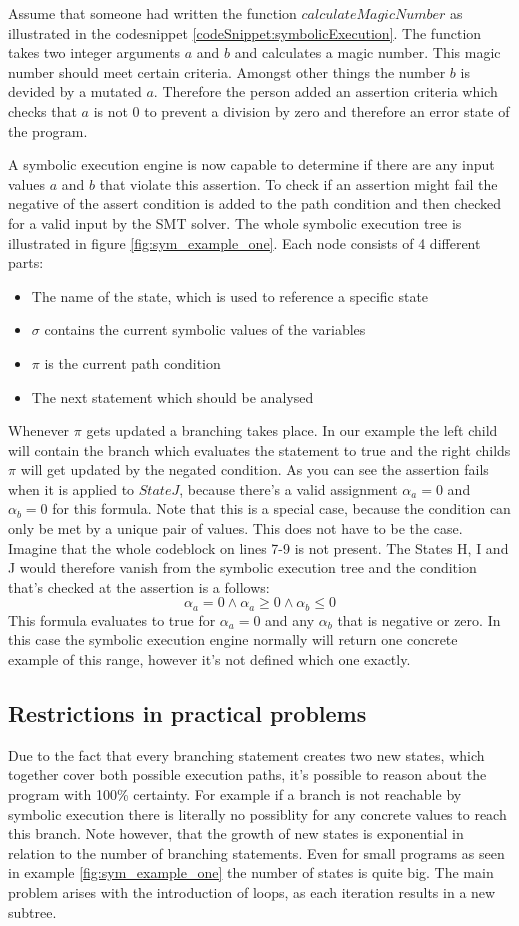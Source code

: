 Assume that someone had written the function $calculateMagicNumber$ as illustrated in the codesnippet \ref{codeSnippet:symbolicExecution}. The function takes two integer arguments $a$ and $b$ and calculates a magic number. This magic number should meet certain criteria. Amongst other things the number $b$ is devided by a mutated $a$. Therefore the person added an assertion criteria which checks that $a$ is not $0$ to prevent a division by zero and therefore an error state of the program.

A symbolic execution engine is now capable to determine if there are any input values $a$  and $b$ that violate this assertion. To check if an assertion might fail the negative of the assert condition is added to the path condition and then checked for a valid input by the SMT solver. The whole symbolic execution tree is illustrated in figure \ref{fig:sym_example_one}. Each node consists of 4 different parts:
\begin{itemize}
\item The name of the state, which is used to reference a specific state
\item $\sigma$ contains the current symbolic values of the variables
\item $\pi$ is the current path condition
\item The next statement which should be analysed
\end{itemize}
Whenever $\pi$ gets updated a branching takes place. In our example the left child will contain the branch which evaluates the statement to true and the right childs $\pi$ will get updated by the negated condition.
As you can see the assertion fails when it is applied to $State J$, because there's a valid assignment $\alpha_a = 0$ and $\alpha_b = 0$ for this formula. Note that this is a special case, because the condition can only be met by a unique pair of values. This does not have to be the case. Imagine that the whole codeblock on lines 7-9 is not present. The States H, I and J would therefore vanish from the symbolic execution tree and the condition that's checked at the assertion is a follows:
$$\alpha_a  = 0 \land \alpha_a \geq 0 \land \alpha_b \leq 0$$
This formula evaluates to true for $\alpha_a = 0$  and any $\alpha_b$ that is negative or zero. In this case the symbolic execution engine normally will return one concrete example of this range, however it's not defined which one exactly. 
\subsection{Restrictions in practical problems}\label{section:symbolic_restrictions}
Due to the fact that every branching statement creates two new states, which together cover both possible execution paths, it's possible to reason about the program with 100\% certainty. For example if a branch is not reachable by symbolic execution there is literally no possiblity for any concrete values to reach this branch. Note however, that the growth of new states is exponential in relation to the number of branching statements. Even for small programs as seen in example \ref{fig:sym_example_one} the number of states is quite big. The main problem arises with the introduction of loops, as each iteration results in a new subtree.

